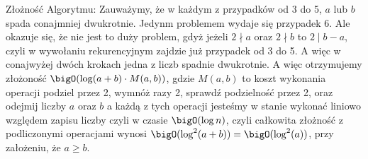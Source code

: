 Złożność Algorytmu:
\newline
Zauważymy, że w każdym z przypadków od 3 do 5, $a$ lub $b$ spada conajmniej dwukrotnie. Jedynm problemem wydaje się przypadek 6. Ale okazuje się, że nie jest to duży problem, gdyż jeżeli $2 \nmid a$ oraz $2 \nmid b$ to $2 \mid b-a$, czyli w wywołaniu rekurencyjnym zajdzie już przypadek od 3 do 5. A więc w conajwyżej dwóch krokach jedna z liczb spadnie dwukrotnie. A więc otrzymujemy złożoność $\bigO(\log (a + b) \cdot M(a,b))$, gdzie $M(a,b)$ to koszt wykonania operacji podziel przez 2, wymnóż razy 2, sprawdź podzielność przez 2, oraz odejmij liczby $a$ oraz $b$ a każdą z tych operacji jesteśmy w stanie wykonać liniowo względem zapisu liczby czyli w czasie $\bigO(\log n)$, czyli całkowita złożność z podliczonymi operacjami wynosi $\bigO(\log^2 (a+b)) = \bigO(\log^2 (a))$, przy założeniu, że $a \geq b$.
